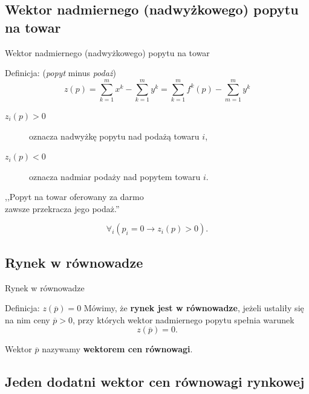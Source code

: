 \documentclass[a4paper, 11pt]{beamer}
\begin{document}
    \subsection{Wektor nadmiernego (nadwyżkowego) popytu na towar}

      \begin{frame}{Wektor nadmiernego (nadwyżkowego) popytu na towar}
	\begin{block}{Definicja: (\textit{popyt} minus \textit{podaż})}
	  $$z(p) = \sum_{k=1}^m x^k - \sum_{k=1}^m y^k = \sum_{k=1}^m f^k (p) -
	  \sum_{m=1}^m y^k$$
	\end{block}

	\begin{description}
	  
	  \item[$z_i (p) > 0$] oznacza nadwyżkę popytu nad podażą towaru $i$,

	  \item[$z_i (p) < 0$] oznacza nadmiar podaży nad popytem towaru $i$.

	\end{description}
	
	\begin{center}
	\alert{,,Popyt na towar oferowany za darmo\\ zawsze przekracza
	jego podaż.''}
	\end{center}
	\[ \forall_i (p_i=0 \rightarrow z_i (p) > 0). \]

      \end{frame}

    \subsection{Rynek w równowadze}

      \begin{frame}{Rynek w równowadze}
	\begin{block}{Definicja: $z(\overline{p}) = 0$}
	  Mówimy, że \textbf{rynek jest w równowadze}, jeżeli ustaliły się na
	  nim ceny $\overline{p} > 0$, przy których wektor nadmiernego popytu
	  spełnia warunek
	  \[ z(\overline{p}) = 0. \]
	\end{block}

	Wektor $\overline{p}$ nazywamy \textbf{wektorem cen równowagi}.
    \end{frame}
    \subsection{Jeden dodatni wektor cen równowagi rynkowej}
\end{document}
